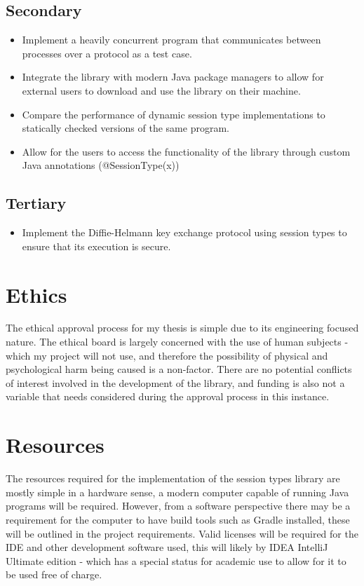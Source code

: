 \documentclass{article}
\begin{document}
\subsection{Secondary}
\begin{itemize}
	\item Implement a heavily concurrent program that communicates between processes over a protocol as a test case.
	\item Integrate the library with modern Java package managers to allow for external users to download and use the library on their machine.
	\item Compare the performance of dynamic session type implementations to statically checked versions of the same program.
	\item Allow for the users to access the functionality of the library through custom Java annotations (@SessionType(x))
\end{itemize}
\subsection{Tertiary}
\begin{itemize}
	\item Implement the Diffie-Helmann key exchange protocol using session types to ensure that its execution is secure.
\end{itemize}
\section{Ethics}
The ethical approval process for my thesis is simple due to its engineering focused nature. The ethical board is largely concerned with the use of human subjects - which my project will not use, and therefore the possibility of physical and psychological harm being caused is a non-factor. There are no potential conflicts of interest involved in the development of the library, and funding is also not a variable that needs considered during the approval process in this instance.
\section{Resources}
The resources required for the implementation of the session types library are mostly simple in a hardware sense, a modern computer capable of running Java programs will be required. However, from a software perspective there may be a requirement for the computer to have build tools such as Gradle installed, these will be outlined in the project requirements. Valid licenses will be required for the IDE and other development software used, this will likely by IDEA IntelliJ Ultimate edition - which has a special status for academic use to allow for it to be used free of charge.
\end{document}
